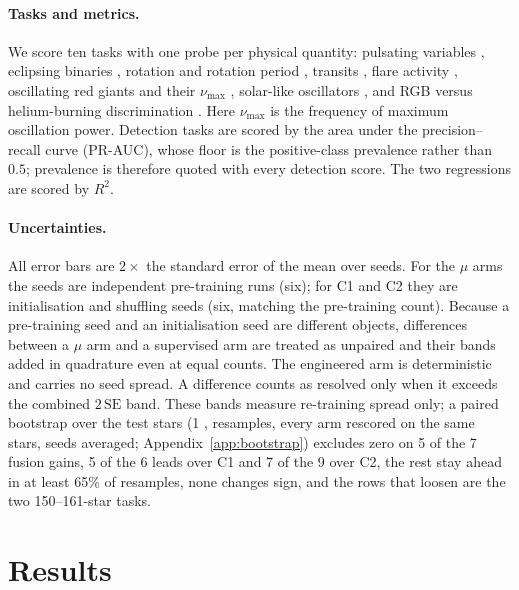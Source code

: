 \documentclass{article}
\providecommand{\DIFaddtex}[1]{{\protect\color{blue} \sf #1}} %
\providecommand{\DIFaddbegin}{} %
\providecommand{\DIFaddend}{} %
\providecommand{\DIFadd}[1]{\texorpdfstring{\DIFaddtex{#1}}{#1}} %
\providecommand{\DIFaddincludegraphics}[2][]{{\color{blue}\fbox{\DIFOincludegraphics[#1]{#2}}}} %
\DeclareRobustCommand{\DIFaddbegin}{\DIFOaddbegin \let\includegraphics\DIFaddincludegraphics} %
\DeclareRobustCommand{\DIFaddend}{\DIFOaddend \let\includegraphics\DIFOincludegraphics} %
\begin{document}
\paragraph{Tasks and metrics.} We score ten tasks with one probe per physical quantity: pulsating
variables \citep{gao2025}, eclipsing binaries \citep{prsa2022}, rotation and rotation period
\citep{boyle2026}, transits \citep{guerrero2021}, flare activity \citep{seli2025,vida2021},
oscillating red giants and their $\nu_{\max}$ \citep{hon2021}, solar-like oscillators
\citep{hatt2023}, and RGB versus helium-burning discrimination \citep{sreenivas2026}. Here
$\nu_{\max}$ is the frequency of maximum oscillation power. Detection tasks are scored by the area
under the precision--recall curve (PR-AUC), whose floor is the positive-class prevalence rather than
$0.5$; prevalence is therefore quoted with every detection score. The two regressions are scored by
$R^{2}$.

\paragraph{Uncertainties.} All error bars are $2\times$ the standard error of the mean over seeds.
For the $\mu$ arms the seeds are independent pre-training runs (six); for C1 and C2 they are
initialisation and shuffling seeds (six, matching the pre-training count). Because a pre-training seed
and an initialisation seed are different objects, differences between a $\mu$ arm and a supervised arm
are treated as unpaired and their bands added in quadrature even at equal counts. The engineered arm is
deterministic and carries no seed spread.
A difference counts as resolved only when it exceeds the combined $2\,\mathrm{SE}$ band. \DIFaddbegin \DIFadd{These bands
measure re-training spread only; a paired bootstrap over the test stars (1}{\DIFadd{,}}\DIFadd{000 resamples, every arm
rescored on the same stars, seeds averaged; Appendix~\ref{app:bootstrap}) excludes zero on 5 of the 7
fusion gains, 5 of the 6 leads over C1 and 7 of the 9 over C2, the rest stay ahead in at least 65\%
of resamples, none changes sign, and the rows that loosen are the two 150--161-star tasks.
}\DIFaddend 

\section{Results}

\begin{table}[t]
\caption{Ten-task scorecard. Linear-readout arms use a frozen logistic or ridge readout on the
mean-pooled representation; the two supervised arms are trained end-to-end per task. Bold marks a
leader separated from the runner-up by the combined $2\,\mathrm{SE}$ band; italic marks a leader that
is only the point-estimate argmax. $n$ is the test-star count and prev.\ the positive-class prevalence.}
\label{tab:scorecard}
\centering
\small

\end{table}
\end{document}
